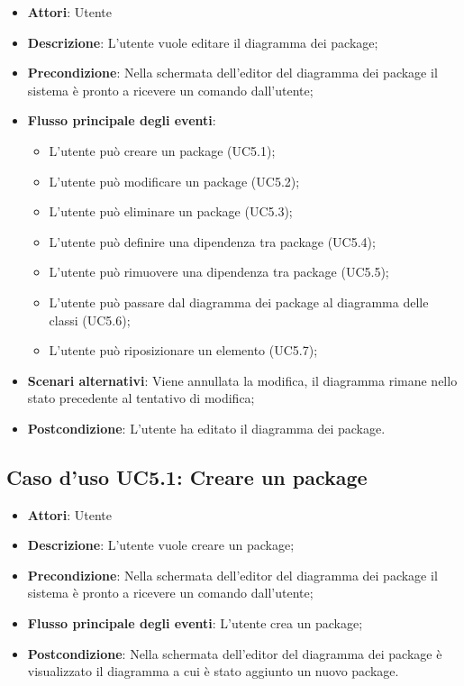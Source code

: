 \documentclass[../AnalisiDeiRequisiti.tex]{subfiles}
\begin{document}
			\begin{itemize}
				\item \textbf{Attori}: Utente
				\item \textbf{Descrizione}: L'utente vuole editare il diagramma dei package;
				\item \textbf{Precondizione}: Nella schermata dell'editor del diagramma dei package il sistema è pronto a ricevere un comando dall'utente;
				\item \textbf{Flusso principale degli eventi}: \begin{itemize}
					\item L'utente può creare un package (UC5.1);
					\item L'utente può modificare un package (UC5.2);
					\item L'utente può eliminare un package (UC5.3);
					\item L'utente può definire una dipendenza tra package (UC5.4);
					\item L'utente può rimuovere una dipendenza tra package (UC5.5);
					\item L'utente può passare dal diagramma dei package al diagramma delle classi (UC5.6);
					\item L'utente può riposizionare un elemento (UC5.7);
				\end{itemize}
				\item \textbf{Scenari alternativi}: Viene annullata la modifica, il diagramma rimane nello stato precedente al tentativo di modifica;
				\item \textbf{Postcondizione}: L'utente ha editato il diagramma dei package.
			\end{itemize}
			\subsection{Caso d'uso UC5.1: Creare un package}
			\begin{itemize}
				\item \textbf{Attori}: Utente
				\item \textbf{Descrizione}: L'utente vuole creare un package;
				\item \textbf{Precondizione}: Nella schermata dell'editor del diagramma dei package il sistema è pronto a ricevere un comando dall'utente;
				\item \textbf{Flusso principale degli eventi}: L'utente crea un package;
				\item \textbf{Postcondizione}: Nella schermata dell'editor del diagramma dei package è visualizzato il diagramma a cui è stato aggiunto un nuovo package.
			\end{itemize}
\end{document}
